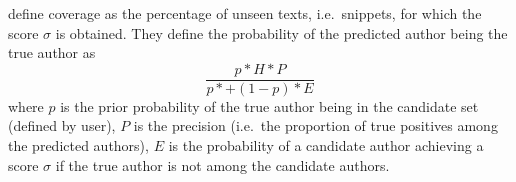 \citet{koppel_authorship_2011} define coverage as the percentage of unseen texts, i.e.\ snippets, 
for which the score $\sigma$ is obtained.
They define the probability of the predicted author being the true author as 
$$\frac{p * H * P}{p * + (1-p) * E}$$
where $p$ is the prior probability of the true author being in the candidate set (defined by user),
$P$ is the precision (i.e.\ the proportion of true positives among the predicted authors),
$E$ is the probability of a candidate author achieving a score $\sigma$ if the true author is not among the candidate authors.